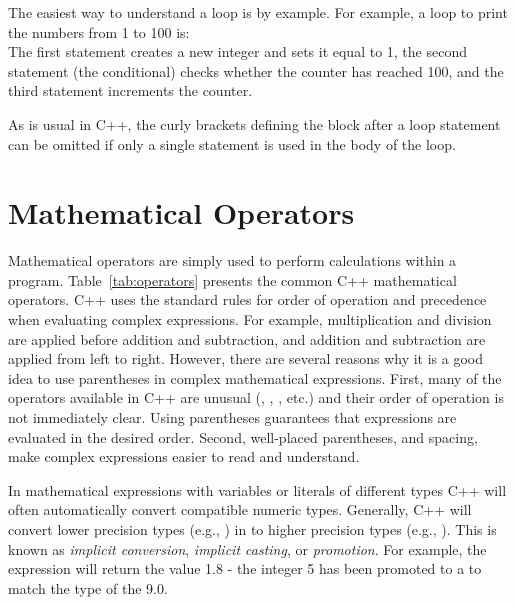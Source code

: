 The easiest way to understand a  loop is by example.  For example, a  loop to print the numbers from 1 to 100 is:\\
The first statement creates a new integer and sets it equal to 1, the second statement (the conditional) checks whether the counter has reached 100, and the third statement increments the counter.
 
As is usual in C++, the curly brackets defining the block after a loop statement can be omitted if only a single statement is used in the body of the loop.  

\section{Mathematical Operators}\label{appendix:operators}

Mathematical operators are simply used to perform calculations within a program.
Table~\ref{tab:operators} presents the common C++ mathematical operators.  C++ uses the standard rules for order of operation and precedence when evaluating complex expressions.  For example, multiplication and division are applied before addition and subtraction, and addition and subtraction are applied from left to right.  However, there are several reasons why it is a good idea to use parentheses in complex mathematical expressions.   First, many of the operators available in C++ are unusual (\codefont{++}, \codefont{\%}, \codefont{+=}, etc.) and their order of operation is not immediately clear.  Using parentheses guarantees that expressions are evaluated in the desired order.  Second, well-placed parentheses, and spacing, make complex expressions easier to read and understand.

In mathematical expressions with variables or literals of different types C++ will often automatically convert compatible numeric types.  Generally, C++ will convert lower precision types (e.g., ) in to higher precision types (e.g., ).   This is known as \emph{implicit conversion}, \emph{implicit casting}, or \emph{promotion}.  For example, the expression  will return the value 1.8 - the integer 5 has been promoted to a  to match the type of the 9.0.  

